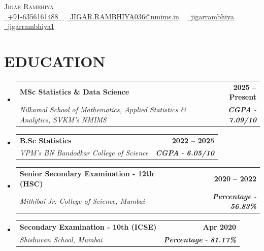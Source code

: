 \documentclass[letterpaper,11pt]{article}
\makeatletter
\newcommand{\resumeSubheading}[4]{
  \vspace{-2pt}\item
    \begin{tabular*}{1.0\textwidth}[t]{l@{\extracolsep{\fill}}r}
      \textbf{\large#1} & \textbf{\small #2} \\
      \textit{\large#3} & \textit{\small #4} \\
     
    \end{tabular*}\vspace{-7pt}
}
\newcommand{\resumeSubHeadingListStart}{\begin{itemize}[leftmargin=0.0in, label={}]}
\newcommand{\resumeSubHeadingListEnd}{\end{itemize}}
\makeatother
\begin{document}
\begin{center}
    {\Huge \scshape Jigar Rambhiya} \\ \vspace{1pt}
    \small \href{tel:+916356161488}{ \raisebox{-0.1\height}\faPhone\ \underline{+91-6356161488} ~} \href{mailto:jigar.rambhiya036@nmims.in}{\raisebox{-0.2\height}\faEnvelope\  \underline{JIGAR.RAMBHIYA036@nmims.in}} ~
    \href{https://www.linkedin.com/in/jigarrambhiya}{\raisebox{-0.2\height}\faLinkedinSquare\ \underline{jigarrambhiya}}  ~
    \href{https://github.com/jigarrambhiya1}{\raisebox{-0.2\height}\faGithub\ \underline{jigarrambhiya1}} ~
\end{center}



\section{EDUCATION}
  \resumeSubHeadingListStart
    \resumeSubheading
      {MSc Statistics \& Data Science}{2025 -- Present}
      {Nilkamal School of Mathematics, Applied Statistics \& Analytics, SVKM's NMIMS}{\textbf{CGPA} - \textbf{7.09/10}}
  \resumeSubHeadingListEnd
    \vspace{-10pt}  
  
 
  \resumeSubHeadingListStart
    \resumeSubheading
      {B.Sc Statistics}{2022 -- 2025}
      {VPM's BN Bandodkar College of Science}{\textbf{CGPA} - \textbf{6.05/10}}
  \resumeSubHeadingListEnd
    \vspace{-10pt}  

  \resumeSubHeadingListStart
    \resumeSubheading
      {Senior Secondary Examination - 12th (HSC)}{2020 -- 2022}
      {Mithibai Jr. College of Science, Mumbai}{\textbf{Percentage} - \textbf{56.83\%}}
  \resumeSubHeadingListEnd
    \vspace{-10pt}  

  \resumeSubHeadingListStart
    \resumeSubheading
      {Secondary Examination - 10th (ICSE)}{Apr 2020}
      {Shishuvan School, Mumbai}{\textbf{Percentage} - \textbf{81.17\%}}
  \resumeSubHeadingListEnd
    \vspace{-10pt}  


\end{document}
